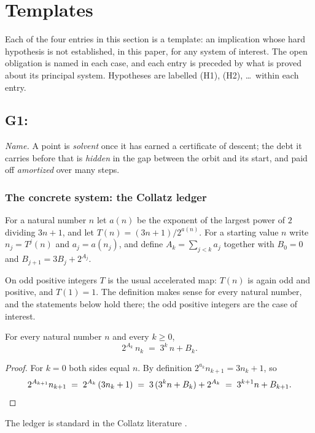 \section{Templates}\label{sec:templates}

Each of the four entries in this section is a template: an implication whose hard hypothesis is not
established, in this paper, for any system of interest. The open obligation is named in each case,
and each entry is preceded by what is proved about its principal system. Hypotheses are labelled
(H1), (H2), \dots\ within each entry.

\subsection{G1: \lawGOne}\label{sec:G1}

\emph{Name.} A point is \emph{solvent} once it has earned a certificate of descent; the debt it
carries before that is \emph{hidden} in the gap between the orbit and its start, and paid off
\emph{amortized} over many steps.

\subsubsection*{The concrete system: the Collatz ledger}\label{sec:collatz}

\begin{definition}\label{def:collatz}
For a natural number $n$ let $a(n)$ be the exponent of the largest power of $2$ dividing $3n+1$, and
let $T(n) = (3n+1)/2^{a(n)}$. For a starting value $n$ write $n_j = T^j(n)$ and $a_j = a(n_j)$, and
define $A_k = \sum_{j<k} a_j$ together with $B_0 = 0$ and $B_{j+1} = 3B_j + 2^{A_j}$.
\end{definition}

On odd positive integers $T$ is the usual accelerated map: $T(n)$ is again odd and positive, and
$T(1) = 1$. The definition makes sense for every natural number, and the statements below hold
there; the odd positive integers are the case of interest.

\begin{theorem}\label{thm:affine-ledger}
For every natural number $n$ and every $k \ge 0$,
\[
  2^{A_k}\, n_k \;=\; 3^k\, n + B_k .
\]
\end{theorem}

\begin{proof}
For $k = 0$ both sides equal $n$. By definition $2^{a_k} n_{k+1} = 3 n_k + 1$, so
\[
  2^{A_{k+1}} n_{k+1} \;=\; 2^{A_k}\,(3n_k + 1) \;=\; 3\,(3^k n + B_k) + 2^{A_k}
  \;=\; 3^{k+1} n + B_{k+1}. \qedhere
\]
\end{proof}
The ledger is standard in the Collatz literature \citep{Lagarias1985}.

